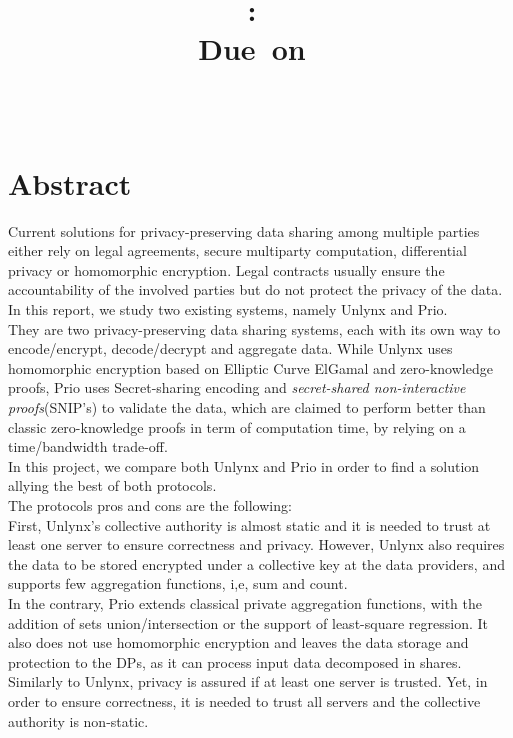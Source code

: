 \documentclass{article}
\title{
\logoepfl
\vspace{2in}
\textmd{\textbf{\hmwkClass:\ \hmwkTitle}}\\
\normalsize\vspace{0.1in}\small{Due\ on\ \hmwkDueDate}\\
\vspace{0.1in}\large{\textit{\hmwkClassInstructor\ \hmwkClassTime}}
\author{\textbf{\hmwkAuthorName}}
\vspace{3in}
}
\begin{document}
\maketitle

\newpage
\section*{Abstract}
Current solutions for privacy-preserving data sharing among multiple parties either rely on legal agreements, secure multiparty computation, differential privacy or homomorphic encryption. Legal contracts usually ensure the accountability of the involved parties but do not protect the privacy of the data.
In this report, we study two existing systems, namely Unlynx and Prio.\\
They are two privacy-preserving data sharing systems, each with its own way to encode/encrypt, decode/decrypt and aggregate data. While Unlynx \cite{unlynx} uses homomorphic encryption based on Elliptic Curve ElGamal and zero-knowledge proofs, Prio \cite{prio} uses Secret-sharing encoding and \textit{secret-shared non-interactive proofs}(SNIP's) to validate the data, which are claimed to perform better than classic zero-knowledge proofs \cite{proof1,proof2} in term of computation time, by relying on a time/bandwidth trade-off.\\
In this project, we compare both Unlynx and Prio in order to find a solution allying the best of both protocols.\\
The protocols pros and cons are the following:\\
First, Unlynx's collective authority is almost static and it is needed to trust at least one server to ensure correctness and privacy. However, Unlynx also requires the data to be stored encrypted under a collective key at the data providers, and supports few aggregation functions, i,e, sum and count.\\
In the contrary, Prio extends classical private aggregation functions, with the addition of sets union/intersection or the support of least-square regression. It also does not use homomorphic encryption and leaves the data storage and protection to the DPs, as it can process input data decomposed in shares. Similarly to Unlynx, privacy is assured if at least one server is trusted.
Yet, in order to ensure correctness, it is needed to trust all servers and the collective authority is non-static.\\
\end{document}
